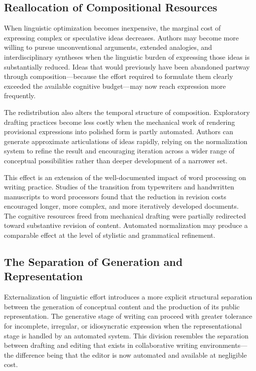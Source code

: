 \documentclass[12pt,a4paper]{article}
\theoremstyle{definition}
\theoremstyle{plain}
\theoremstyle{remark}
\begin{document}
\subsection{Reallocation of Compositional Resources}

When linguistic optimization becomes inexpensive, the marginal cost of expressing complex or
speculative ideas decreases. Authors may become more willing to pursue unconventional
arguments, extended analogies, and interdisciplinary syntheses when the linguistic burden of
expressing those ideas is substantially reduced. Ideas that would previously have been
abandoned partway through composition---because the effort required to formulate them
clearly exceeded the available cognitive budget---may now reach expression more frequently.

The redistribution also alters the temporal structure of composition. Exploratory drafting
practices become less costly when the mechanical work of rendering provisional expressions
into polished form is partly automated. Authors can generate approximate articulations of ideas rapidly,
relying on the normalization system to refine the result and encouraging iteration
across a wider range of conceptual possibilities rather than deeper development of a
narrower set.

This effect is an extension of the well-documented impact of word processing on writing
practice. Studies of the transition from typewriters and handwritten manuscripts to word
processors found that the reduction in revision costs encouraged longer, more complex, and
more iteratively developed documents. The cognitive resources freed from mechanical drafting
were partially redirected toward substantive revision of content. Automated normalization
may produce a comparable effect at the level of stylistic and grammatical refinement.

\subsection{The Separation of Generation and Representation}

Externalization of linguistic effort introduces a more explicit structural separation between
the generation of conceptual content and the production of its public representation. The
generative stage of writing can proceed with greater tolerance for incomplete, irregular, or
idiosyncratic expression when the representational stage is handled by an automated system.
This division resembles the separation between drafting and editing that exists in
collaborative writing environments---the difference being that the editor is now automated
and available at negligible cost.
\end{document}
